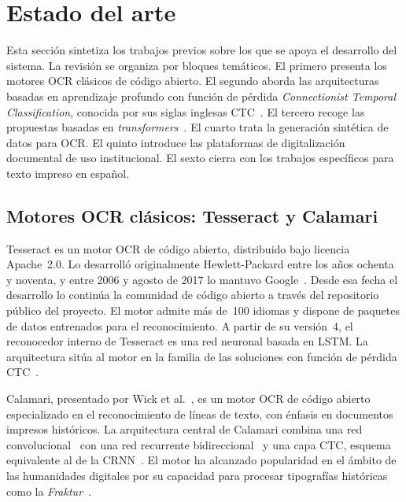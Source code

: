 \section{Estado del arte}
\label{sec:estado-arte}

Esta sección sintetiza los trabajos previos sobre los que se apoya el desarrollo del sistema. La revisión se organiza por bloques temáticos. El primero presenta los motores OCR clásicos de código abierto. El segundo aborda las arquitecturas basadas en aprendizaje profundo con función de pérdida \textit{Connectionist Temporal Classification}, conocida por sus siglas inglesas CTC~\cite{graves2006ctc}. El tercero recoge las propuestas basadas en \textit{transformers}~\cite{vaswani2017transformer}. El cuarto trata la generación sintética de datos para OCR. El quinto introduce las plataformas de digitalización documental de uso institucional. El sexto cierra con los trabajos específicos para texto impreso en español.

\subsection{Motores OCR clásicos: Tesseract y Calamari}

Tesseract es un motor OCR de código abierto, distribuido bajo licencia Apache~2.0. Lo desarrolló originalmente Hewlett-Packard entre los años ochenta y noventa, y entre 2006 y agosto de 2017 lo mantuvo Google~\cite{smith2007tesseract}. Desde esa fecha el desarrollo lo continúa la comunidad de código abierto a través del repositorio público del proyecto. El motor admite más de~100 idiomas y dispone de paquetes de datos entrenados para el reconocimiento. A partir de su versión~4, el reconocedor interno de Tesseract es una red neuronal basada en LSTM. La arquitectura sitúa al motor en la familia de las soluciones con función de pérdida CTC~\cite{graves2006ctc}.

Calamari, presentado por Wick et al.~\cite{wick2018calamari}, es un motor OCR de código abierto especializado en el reconocimiento de líneas de texto, con énfasis en documentos impresos históricos. La arquitectura central de Calamari combina una red convolucional~\cite{goodfellow2016deeplearning} con una red recurrente bidireccional~\cite{goodfellow2016deeplearning} y una capa CTC, esquema equivalente al de la CRNN~\cite{shi2016crnn}. El motor ha alcanzado popularidad en el ámbito de las humanidades digitales por su capacidad para procesar tipografías históricas como la \textit{Fraktur}~\cite{breuel2013ocropus}.

